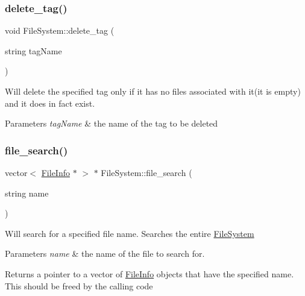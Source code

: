 \subsubsection{\texorpdfstring{delete\+\_\+tag()}{delete\_tag()}}
{\footnotesize\ttfamily void File\+System\+::delete\+\_\+tag (\begin{DoxyParamCaption}\item[{string}]{tag\+Name }\end{DoxyParamCaption})}

Will delete the specified tag only if it has no files associated with it(it is empty) and it does in fact exist. 
\begin{DoxyParams}{Parameters}
{\em tag\+Name} & the name of the tag to be deleted \\
\hline
\end{DoxyParams}
\mbox{\label{classFileSystem_a7a49d757e2b4d3c7344925387b1fe124}} 
\subsubsection{\texorpdfstring{file\+\_\+search()}{file\_search()}}
{\footnotesize\ttfamily vector$<$ \mbox{\hyperlink{classFileInfo}{File\+Info}} $\ast$ $>$ $\ast$ File\+System\+::file\+\_\+search (\begin{DoxyParamCaption}\item[{string}]{name }\end{DoxyParamCaption})}

Will search for a specified file name. Searches the entire \mbox{\hyperlink{classFileSystem}{File\+System}} 
\begin{DoxyParams}{Parameters}
{\em name} & the name of the file to search for. \\
\hline
\end{DoxyParams}
\begin{DoxyReturn}{Returns}
a pointer to a vector of \mbox{\hyperlink{classFileInfo}{File\+Info}} objects that have the specified name. This should be freed by the calling code 
\end{DoxyReturn}
\mbox{\label{classFileSystem_a32588895aea79931d4a09deb89ec2659}} 
